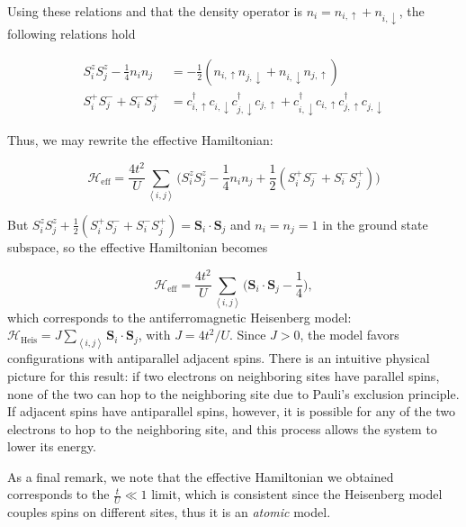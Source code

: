 \documentclass[10pt, twocolumn, twoside]{article}
\begin{document}
Using these relations and that the density operator is $n_i = n_{i,\uparrow} + n_{i,\downarrow}$, the following relations hold

\begin{equation}
\begin{split}
S_i^z S_j^z - \frac{1}{4} n_i n_j &= -\frac{1}{2} ( n_{i,\uparrow} n_{j,\downarrow} + n_{i,\downarrow} n_{j,\uparrow} ) \\
S_i^+ S_j^- + S_i^- S_j^+ &= c_{i,\uparrow}^\dagger c_{i,\downarrow} c_{j,\downarrow}^\dagger  c_{j,\uparrow} +  c_{i,\downarrow}^\dagger c_{i,\uparrow} c_{j,\uparrow}^\dagger  c_{j,\downarrow}
\end{split}
\end{equation}

Thus, we may rewrite the effective Hamiltonian:

\begin{equation}
\mathcal{H}_{\text{eff}} = \frac{4t^2}{U} \sum_{\left\langle i, j \right\rangle} \bigg( S_i^z S_j^z - \frac{1}{4} n_i n_j + \frac{1}{2} ( S_i^+ S_j^- + S_i^- S_j^+ ) \bigg)
\end{equation}

But $S_i^z S_j^z + \frac{1}{2} ( S_i^+ S_j^- + S_i^- S_j^+) = \bm S_i \cdot \bm S_j$ and $n_i = n_j = 1$ in the ground state subspace, so the effective Hamiltonian becomes

\begin{equation}
\mathcal{H}_{\text{eff}} = \frac{4t^2}{U} \sum_{\left\langle i, j \right\rangle} \bigg( \bm S_i \cdot \bm S_j  - \frac{1}{4}  \bigg),
\end{equation}
which corresponds to the antiferromagnetic Heisenberg model: $\mathcal{H}_{\text{Heis}} = J \sum_{\left\langle i, j \right\rangle} \bm S_i \cdot \bm S_j $, with $J = 4 t^2 / U$. Since $J > 0$, the model favors configurations with antiparallel adjacent spins. There is an intuitive physical picture for this result: if two electrons on neighboring sites have parallel spins, none of the two can hop to the neighboring site due to Pauli's exclusion principle. If adjacent spins have antiparallel spins, however, it is possible for any of the two electrons to hop to the neighboring site, and this process allows the system to lower its energy.

As a final remark, we note that the effective Hamiltonian we obtained corresponds to the $\frac{t}{U} \ll 1$ limit, which is consistent since the Heisenberg model couples spins on different sites, thus it is an \emph{atomic} model.
\end{document}
